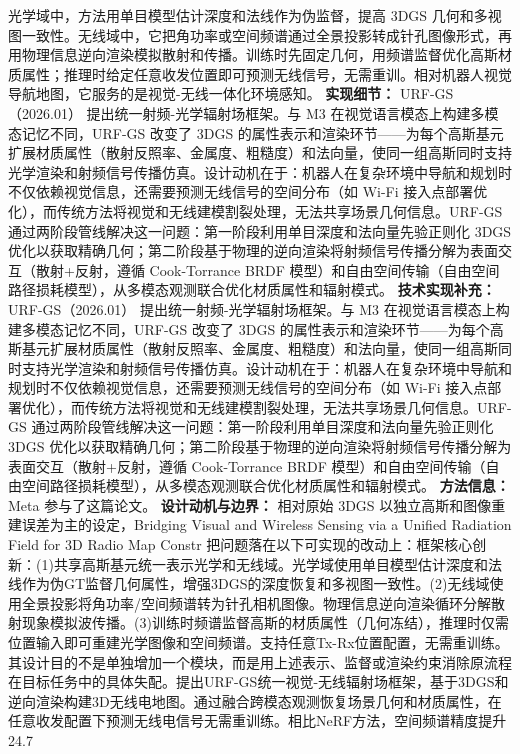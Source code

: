 光学域中，方法用单目模型估计深度和法线作为伪监督，提高 3DGS 几何和多视图一致性。无线域中，它把角功率或空间频谱通过全景投影转成针孔图像形式，再用物理信息逆向渲染模拟散射和传播。训练时先固定几何，用频谱监督优化高斯材质属性；推理时给定任意收发位置即可预测无线信号，无需重训。相对机器人视觉导航地图，它服务的是视觉-无线一体化环境感知。
\textbf{实现细节：} URF-GS（2026.01） 提出统一射频-光学辐射场框架。与 M3 在视觉语言模态上构建多模态记忆不同，URF-GS 改变了 3DGS 的属性表示和渲染环节——为每个高斯基元扩展材质属性（散射反照率、金属度、粗糙度）和法向量，使同一组高斯同时支持光学渲染和射频信号传播仿真。设计动机在于：机器人在复杂环境中导航和规划时不仅依赖视觉信息，还需要预测无线信号的空间分布（如 Wi-Fi 接入点部署优化），而传统方法将视觉和无线建模割裂处理，无法共享场景几何信息。URF-GS 通过两阶段管线解决这一问题：第一阶段利用单目深度和法向量先验正则化 3DGS 优化以获取精确几何；第二阶段基于物理的逆向渲染将射频信号传播分解为表面交互（散射+反射，遵循 Cook-Torrance BRDF 模型）和自由空间传输（自由空间路径损耗模型），从多模态观测联合优化材质属性和辐射模式。
\textbf{技术实现补充：} URF-GS（2026.01） 提出统一射频-光学辐射场框架。与 M3 在视觉语言模态上构建多模态记忆不同，URF-GS 改变了 3DGS 的属性表示和渲染环节——为每个高斯基元扩展材质属性（散射反照率、金属度、粗糙度）和法向量，使同一组高斯同时支持光学渲染和射频信号传播仿真。设计动机在于：机器人在复杂环境中导航和规划时不仅依赖视觉信息，还需要预测无线信号的空间分布（如 Wi-Fi 接入点部署优化），而传统方法将视觉和无线建模割裂处理，无法共享场景几何信息。URF-GS 通过两阶段管线解决这一问题：第一阶段利用单目深度和法向量先验正则化 3DGS 优化以获取精确几何；第二阶段基于物理的逆向渲染将射频信号传播分解为表面交互（散射+反射，遵循 Cook-Torrance BRDF 模型）和自由空间传输（自由空间路径损耗模型），从多模态观测联合优化材质属性和辐射模式。
\textbf{方法信息：} Meta 参与了这篇论文。
\textbf{设计动机与边界：} 相对原始 3DGS 以独立高斯和图像重建误差为主的设定，Bridging Visual and Wireless Sensing via a Unified Radiation Field for 3D Radio Map Constr 把问题落在以下可实现的改动上：框架核心创新：(1)共享高斯基元统一表示光学和无线域。光学域使用单目模型估计深度和法线作为伪GT监督几何属性，增强3DGS的深度恢复和多视图一致性。(2)无线域使用全景投影将角功率/空间频谱转为针孔相机图像。物理信息逆向渲染循环分解散射现象模拟波传播。(3)训练时频谱监督高斯的材质属性（几何冻结），推理时仅需位置输入即可重建光学图像和空间频谱。支持任意Tx-Rx位置配置，无需重训练。其设计目的不是单独增加一个模块，而是用上述表示、监督或渲染约束消除原流程在目标任务中的具体失配。提出URF-GS统一视觉-无线辐射场框架，基于3DGS和逆向渲染构建3D无线电地图。通过融合跨模态观测恢复场景几何和材质属性，在任意收发配置下预测无线电信号无需重训练。相比NeRF方法，空间频谱精度提升24.7%

